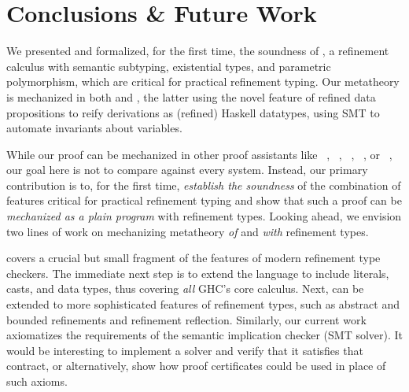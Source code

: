 \section{Conclusions \& Future Work}
  
We presented and formalized, for the first time, the soundness of
\sysrf, a refinement calculus with semantic subtyping, existential 
types, and parametric polymorphism, which are critical for practical 
refinement typing. 
%
Our metatheory is mechanized in both \coq and \lh, the latter
using the novel feature of refined data propositions to reify 
derivations as (refined) Haskell datatypes, using SMT
to automate invariants about variables.

While our proof can be mechanized in other proof assistants like
\agda~\cite{agda},
\isabelle~\cite{NPW2002},
\beluga~\cite{beluga},
\dafny~\cite{Dafny}, or
\fstar~\cite{metafstar},
our goal here is not to compare \lh against every system.
%
Instead, our primary contribution is to,
for the first time, \emph{establish the soundness}
of the combination of features critical for practical
refinement typing and show that such a proof can be 
\emph{mechanized as a plain program} with refinement types.
%
%
Looking ahead, 
we envision two lines
of work on mechanizing metatheory \emph{of}
and \emph{with} refinement types.

%
\sysrf covers a crucial but small
fragment of the features of modern refinement
type checkers. 
The immediate next step is to extend the language 
to include literals, casts, and data types, 
thus covering \textit{all} GHC's core calculus. 
Next, \sysrf can be extended to more sophisticated 
features of refinement types, such as 
abstract and bounded refinements and refinement reflection. 
%
Similarly, our current work axiomatizes the
requirements of the semantic implication
checker (\ie SMT solver).
It would be interesting to implement a solver
and verify that it satisfies that contract, or
alternatively, show how proof certificates \cite{pcc}
could be used in place of such axioms.

